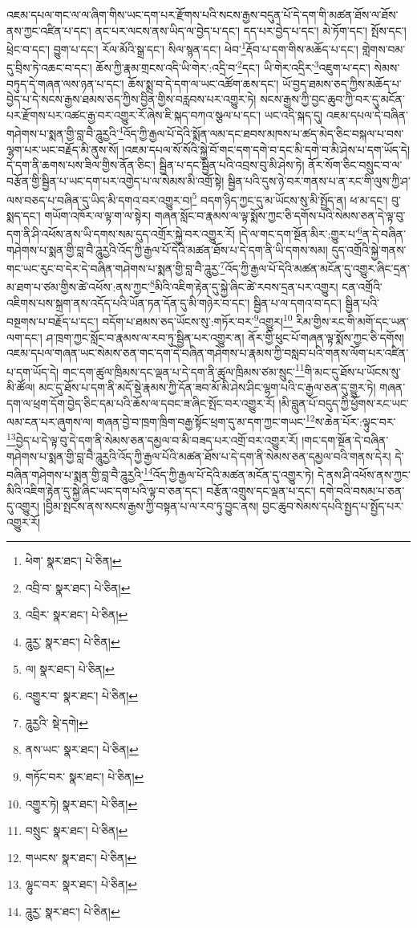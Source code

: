 འཇམ་དཔལ་གང་ལ་ལ་ཞིག་གིས་ཡང་དག་པར་རྫོགས་པའི་སངས་རྒྱས་བདུན་པོ་དེ་དག་གི་མཚན་ཐོས་ལ་ཐོས་ནས་ཀྱང་འཛིན་པ་དང་། ནང་པར་ལངས་ནས་ཡིད་ལ་བྱེད་པ་དང་། དད་པར་བྱེད་པ་དང་། མེ་ཏོག་དང་། སྤོས་དང་། ཕྲེང་བ་དང་། བྱུག་པ་དང་། རོལ་མོའི་སྒྲ་དང་། སིལ་སྙན་དང་། ཕེབ་\footnote{ཕེག་  སྣར་ཐང་།  པེ་ཅིན། }རྡོབ་པ་དག་གིས་མཆོད་པ་དང་། གླེགས་བམ་དུ་བྲིས་ཏེ་འཆང་བ་དང་། ཆོས་ཀྱི་རྣམ་གྲངས་འདི་ཡི་གེར་:འདྲི་བ་\footnote{འབྲི་བ་  སྣར་ཐང་།  པེ་ཅིན། }དང་། ཡི་གེར་འདྲིར་\footnote{འབྲིར་  སྣར་ཐང་།  པེ་ཅིན། }འཇུག་པ་དང་། སེམས་བཏུད་དེ་གཞན་ལས་ཉན་པ་དང་། ཆོས་སྨྲ་བ་དེ་དག་ལ་ཡང་འཚོག་ཆས་དང་། ཡོ་བྱད་ཐམས་ཅད་ཀྱིས་མཆོད་པ་བྱེད་པ་དེ་སངས་རྒྱས་ཐམས་ཅད་ཀྱིས་བྱིན་གྱིས་བརླབས་པར་འགྱུར་ཏེ། སངས་རྒྱས་ཀྱི་བྱང་ཆུབ་ཀྱི་བར་དུ་མངོན་པར་རྫོགས་པར་འཚང་རྒྱ་བར་འགྱུར་རོ་ཞེས་ཇི་སྐད་བཀའ་སྩལ་པ་དང་། ཡང་འདི་སྐད་དུ། འཇམ་དཔལ་དེ་བཞིན་གཤེགས་པ་སྨན་གྱི་བླ་བཻ་ཌཱུརྱའི་\footnote{ཌཱུརྱ་  སྣར་ཐང་།  པེ་ཅིན། }འོད་ཀྱི་རྒྱལ་པོ་དེའི་སྨོན་ལམ་དང་ཐབས་མཁས་པ་ཚད་མེད་ཅིང་བསྐལ་པ་བས་ལྷག་པར་ཡང་བརྗོད་མི་ནུས་སོ། །འཇམ་དཔལ་སོ་སོའི་སྐྱེ་བོ་གང་དག་དགེ་བ་དང་མི་དགེ་བ་མི་ཤེས་པ་དག་ཡོད་དེ། དེ་དག་ནི་ཆགས་པས་ཟིལ་གྱིས་ནོན་ཅིང་། སྦྱིན་པ་དང་སྦྱིན་པའི་འབྲས་བུ་མི་ཤེས་ཏེ། ནོར་སོག་ཅིང་བསྲུང་བ་ལ་བརྩོན་གྱི་སྦྱིན་པ་ཡང་དག་པར་འགྱེད་པ་ལ་སེམས་མི་འགྲོ་སྟེ། སྦྱིན་པའི་དུས་ཉེ་བར་གནས་པ་ན་རང་གི་ལུས་ཀྱི་ཤ་ལས་བཅད་པ་བཞིན་དུ་ཡིད་མི་དགའ་བར་འགྱུར་བ།\footnote{ལ།  སྣར་ཐང་།  པེ་ཅིན། } བདག་ཉིད་ཀྱང་དུ་མ་ཡོངས་སུ་མི་སྤྱོད་ན། ཕ་མ་དང་། བུ་སྨད་དང་། གཡོག་འཁོར་ལ་ལྟ་ག་ལ་སྟེར། གཞན་སློང་བ་རྣམས་ལ་ལྟ་སྨོས་ཀྱང་ཅི་དགོས་པའི་སེམས་ཅན་དེ་ལྟ་བུ་དག་ནི་ཤི་འཕོས་ནས་ཡི་དགས་སམ་དུད་འགྲོར་སྐྱེ་བར་འགྱུར་རོ། །དེ་ལ་གང་དག་སྔོན་མིར་:གྱུར་པ་\footnote{འགྱུར་བ་  སྣར་ཐང་།  པེ་ཅིན། }ན་དེ་བཞིན་གཤེགས་པ་སྨན་གྱི་བླ་བཻ་ཌཱུརྱའི་འོད་ཀྱི་རྒྱལ་པོ་དེའི་མཚན་ཐོས་པ་དེ་དག་ནི་ཡི་དགས་སམ། དུད་འགྲོའི་སྐྱེ་གནས་གང་ཡང་རུང་བ་དེར་དེ་བཞིན་གཤེགས་པ་སྨན་གྱི་བླ་བཻ་ཌཱུརྱ་\footnote{ཌཱུརྱའི་  སྡེ་དགེ། }འོད་ཀྱི་རྒྱལ་པོ་དེའི་མཚན་མངོན་དུ་འགྱུར་ཞིང་དྲན་མ་ཐག་པ་ཙམ་གྱིས་ཚེ་འཕོས་:ནས་ཀྱང་\footnote{ནས་ཡང་  སྣར་ཐང་།  པེ་ཅིན། }མིའི་འཇིག་རྟེན་དུ་སྐྱེ་ཞིང་ཚེ་རབས་དྲན་པར་འགྱུར། ངན་འགྲོའི་འཇིགས་པས་སྐྲག་ནས་འདོད་པའི་ཡོན་ཏན་དོན་དུ་མི་གཉེར་བ་དང་། སྦྱིན་པ་ལ་དགའ་བ་དང་། སྦྱིན་པའི་བསྔགས་པ་བརྗོད་པ་དང་། བདོག་པ་ཐམས་ཅད་ཡོངས་སུ་:གཏོར་བར་\footnote{གཏོང་བར་  སྣར་ཐང་།  པེ་ཅིན། }འགྱུར།\footnote{འགྱུར་ཏེ།  སྣར་ཐང་།  པེ་ཅིན། } རིམ་གྱིས་རང་གི་མགོ་དང་ཡན་ལག་དང་། ཤ་ཁྲག་ཀྱང་སློང་བ་རྣམས་ལ་རབ་ཏུ་སྦྱིན་པར་འགྱུར་ན། ནོར་གྱི་ཕུང་པོ་གཞན་ལྟ་སྨོས་ཀྱང་ཅི་དགོས། འཇམ་དཔལ་གཞན་ཡང་སེམས་ཅན་གང་དག་དེ་བཞིན་གཤེགས་པ་རྣམས་ཀྱི་བསླབ་པའི་གནས་ལོག་པར་འཛིན་པ་དག་ཡོད་དེ། གང་དག་ཚུལ་ཁྲིམས་དང་ལྡན་པ་དེ་དག་ནི་ཚུལ་ཁྲིམས་ཙམ་སྲུང་\footnote{བསྲུང་  སྣར་ཐང་།  པེ་ཅིན། }གི་མང་དུ་ཐོས་པ་ཡོངས་སུ་མི་ཚོལ། མང་དུ་ཐོས་པ་དག་ནི་མདོ་སྡེ་རྣམས་ཀྱི་དོན་ཟབ་མོ་མི་ཤེས་ཤིང་ལྷག་པའི་ང་རྒྱལ་ཅན་དུ་གྱུར་ཏེ། གཞན་དག་ལ་ཕྲག་དོག་བྱེད་ཅིང་དམ་པའི་ཆོས་ལ་དབང་ཟ་ཞིང་སྤོང་བར་འགྱུར་རོ། །མི་བླུན་པོ་བདུད་ཀྱི་ཕྱོགས་རང་ཡང་ལམ་ངན་པར་ཞུགས་ལ། གཞན་བྱེ་བ་ཁྲག་ཁྲིག་བརྒྱ་སྟོང་ཕྲག་དུ་མ་དག་ཀྱང་གཡང་\footnote{གཡངས་  སྣར་ཐང་།  པེ་ཅིན། }ས་ཆེན་པོར་:ལྟུང་བར་\footnote{ལྷུང་བར་  སྣར་ཐང་།  པེ་ཅིན། }བྱེད་པ་དེ་ལྟ་བུ་དེ་དག་ནི་སེམས་ཅན་དམྱལ་བ་མི་བཟད་པར་འགྲོ་བར་འགྱུར་རོ། །གང་དག་སྔོན་དེ་བཞིན་གཤེགས་པ་སྨན་གྱི་བླ་བཻ་ཌཱུརྱའི་འོད་ཀྱི་རྒྱལ་པོའི་མཚན་ཐོས་པ་དེ་དག་ནི་སེམས་ཅན་དམྱལ་བའི་གནས་དེར། དེ་བཞིན་གཤེགས་པ་སྨན་གྱི་བླ་བཻ་ཌཱུརྱའི་\footnote{ཌཱུརྱ་  སྣར་ཐང་།  པེ་ཅིན། }འོད་ཀྱི་རྒྱལ་པོ་དེའི་མཚན་མངོན་དུ་འགྱུར་ཏེ། དེ་ནས་ཤི་འཕོས་ནས་ཀྱང་མིའི་འཇིག་རྟེན་དུ་སྐྱེ་ཞིང་ཡང་དག་པའི་ལྟ་བ་ཅན་དང་། བརྩོན་འགྲུས་དང་ལྡན་པ་དང་། དགེ་བའི་བསམ་པ་ཅན་དུ་འགྱུར། །བྱིམ་སྤངས་ནས་སངས་རྒྱས་ཀྱི་བསྟན་པ་ལ་རབ་ཏུ་བྱུང་ནས། བྱང་ཆུབ་སེམས་དཔའི་སྤྱད་པ་སྤྱོད་པར་འགྱུར་རོ། 